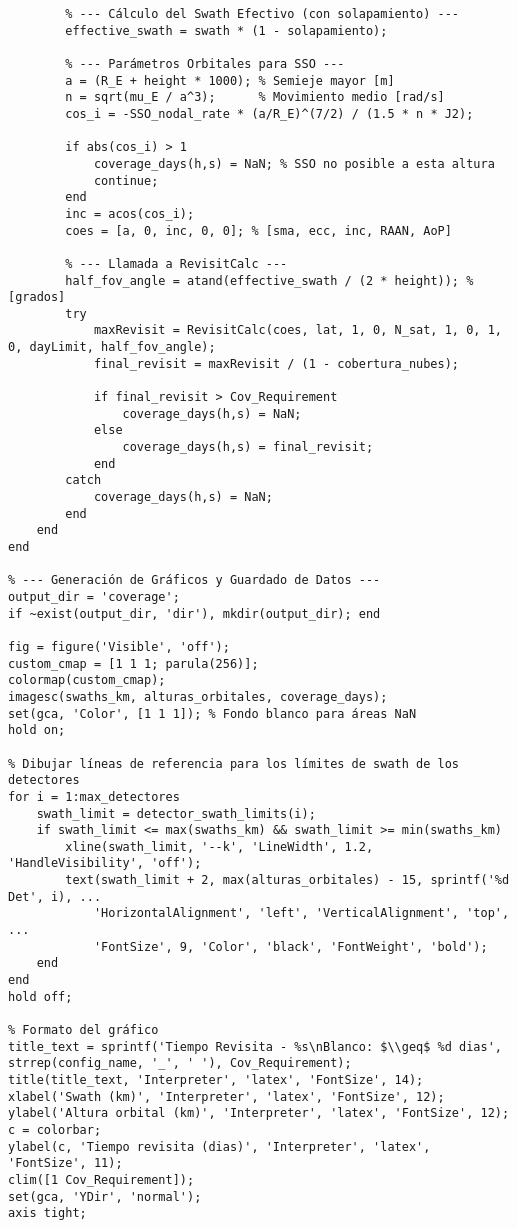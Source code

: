 \begin{verbatim}
        % --- Cálculo del Swath Efectivo (con solapamiento) ---
        effective_swath = swath * (1 - solapamiento);
        
        % --- Parámetros Orbitales para SSO ---
        a = (R_E + height * 1000); % Semieje mayor [m]
        n = sqrt(mu_E / a^3);      % Movimiento medio [rad/s]
        cos_i = -SSO_nodal_rate * (a/R_E)^(7/2) / (1.5 * n * J2);
        
        if abs(cos_i) > 1
            coverage_days(h,s) = NaN; % SSO no posible a esta altura
            continue;
        end
        inc = acos(cos_i);
        coes = [a, 0, inc, 0, 0]; % [sma, ecc, inc, RAAN, AoP]

        % --- Llamada a RevisitCalc ---
        half_fov_angle = atand(effective_swath / (2 * height)); % [grados]
        try
            maxRevisit = RevisitCalc(coes, lat, 1, 0, N_sat, 1, 0, 1, 0, dayLimit, half_fov_angle);
            final_revisit = maxRevisit / (1 - cobertura_nubes);
            
            if final_revisit > Cov_Requirement
                coverage_days(h,s) = NaN;
            else
                coverage_days(h,s) = final_revisit;
            end
        catch
            coverage_days(h,s) = NaN;
        end
    end
end

% --- Generación de Gráficos y Guardado de Datos ---
output_dir = 'coverage';
if ~exist(output_dir, 'dir'), mkdir(output_dir); end

fig = figure('Visible', 'off');
custom_cmap = [1 1 1; parula(256)];
colormap(custom_cmap);
imagesc(swaths_km, alturas_orbitales, coverage_days);
set(gca, 'Color', [1 1 1]); % Fondo blanco para áreas NaN
hold on;

% Dibujar líneas de referencia para los límites de swath de los detectores
for i = 1:max_detectores
    swath_limit = detector_swath_limits(i);
    if swath_limit <= max(swaths_km) && swath_limit >= min(swaths_km)
        xline(swath_limit, '--k', 'LineWidth', 1.2, 'HandleVisibility', 'off');
        text(swath_limit + 2, max(alturas_orbitales) - 15, sprintf('%d Det', i), ...
            'HorizontalAlignment', 'left', 'VerticalAlignment', 'top', ...
            'FontSize', 9, 'Color', 'black', 'FontWeight', 'bold');
    end
end
hold off;

% Formato del gráfico
title_text = sprintf('Tiempo Revisita - %s\nBlanco: $\\geq$ %d dias', strrep(config_name, '_', ' '), Cov_Requirement);
title(title_text, 'Interpreter', 'latex', 'FontSize', 14);
xlabel('Swath (km)', 'Interpreter', 'latex', 'FontSize', 12);
ylabel('Altura orbital (km)', 'Interpreter', 'latex', 'FontSize', 12);
c = colorbar;
ylabel(c, 'Tiempo revisita (dias)', 'Interpreter', 'latex', 'FontSize', 11);
clim([1 Cov_Requirement]);
set(gca, 'YDir', 'normal');
axis tight;


\end{verbatim}
